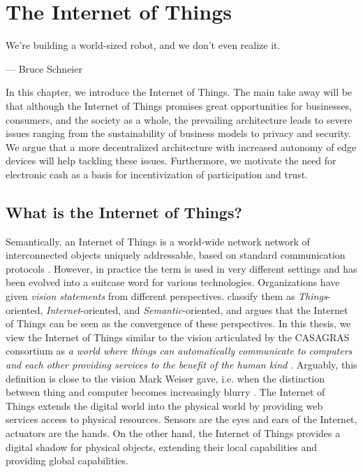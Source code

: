 \chapter{The Internet of Things}
\label{sec:iot}

\epigraph{We're building a world-sized robot, and we don't even realize it.}{--- \textup{Bruce Schneier}}

In this chapter, we introduce the Internet of Things. The main take away will be that although the Internet of Things promises great opportunities for businesses, consumers, and the society as a whole, the prevailing architecture leads to severe issues ranging from the sustainability of business models to privacy and security. We argue that a more decentralized architecture with increased autonomy of edge devices will help tackling these issues. Furthermore, we motivate the need for electronic cash as a basis for incentivization of participation and trust.

\section{What is the Internet of Things?}

Semantically, an Internet of Things is a world-wide network network of interconnected objects uniquely addressable, based on standard communication protocols \parencite{infso2008networked}. However, in practice the term is used in very different settings and has been evolved into a suitcase word for various technologies. Organizations have given \emph{vision statements} from different perspectives. \cite{Atzori20102787} classify them as \emph{Things}-oriented, \emph{Internet}-oriented, and \emph{Semantic}-oriented, and argues that the Internet of Things can be seen as the convergence of these perspectives. In this thesis, we view the Internet of Things similar to the vision articulated by the CASAGRAS consortium as \emph{a world where things can automatically communicate to computers and each other providing services to the benefit of the human kind} \parencite[c.f. ]{Atzori20102787}. Arguably, this definition is close to the vision Mark Weiser gave, i.e. when the distinction between thing and computer becomes increasingly blurry \parencite{weiser:13609162}. The Internet of Things extends the digital world into the physical world by providing web services access to physical resources. Sensors are the eyes and ears of the Internet, actuators are the hands. On the other hand, the Internet of Things provides a digital shadow for physical objects, extending their local capabilities and providing global capabilities.

